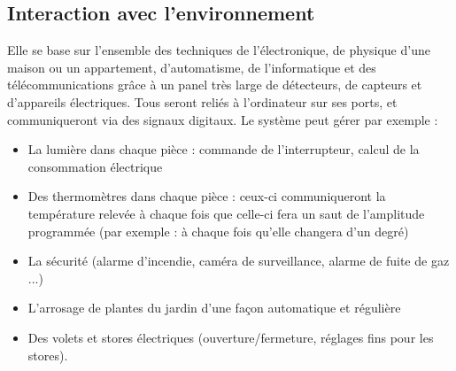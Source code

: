 \begin{spacing}{1.2}
\subsection{Interaction avec l'environnement} 
Elle se base sur l'ensemble des techniques de l'électronique, de physique d’une maison ou un appartement, d'automatisme, de l'informatique et des télécommunications grâce à un panel très large de détecteurs, de capteurs et d’appareils électriques. Tous seront reliés à l’ordinateur sur ses ports, et communiqueront via des signaux digitaux.
Le système peut gérer par exemple :\\
\begin{itemize}
\item La lumière dans chaque pièce : commande de l’interrupteur, calcul de la consommation électrique
\item	Des thermomètres dans chaque pièce : ceux-ci communiqueront la température relevée à chaque fois que celle-ci fera un saut de l’amplitude programmée (par exemple : à chaque fois qu’elle changera d’un degré)
\item La sécurité (alarme d’incendie, caméra de surveillance, alarme de fuite de gaz ...)
\item L’arrosage de plantes du jardin d’une façon automatique et régulière 
\item Des volets et stores électriques (ouverture/fermeture, réglages fins pour les stores).
\end{itemize}



\end{spacing}
